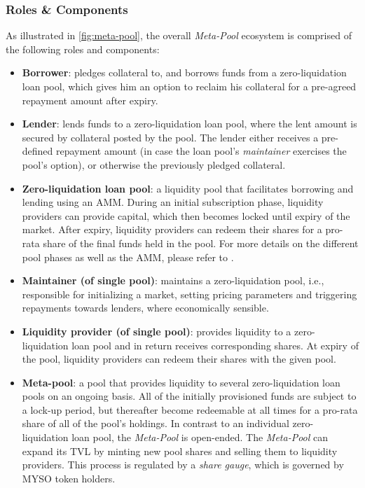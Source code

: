 \documentclass[a4paper]{article}
\begin{document}
\subsubsection{Roles \& Components}
\label{sec:roles}
As illustrated in \cref{fig:meta-pool}, the overall \emph{Meta-Pool} ecosystem is comprised of the following roles and components:
\begin{itemize}
    \item \textbf{Borrower}: pledges collateral to, and borrows funds from a zero-liquidation loan pool, which gives him an option to reclaim his collateral for a pre-agreed repayment amount after expiry.
    \item \textbf{Lender}: lends funds to a zero-liquidation loan pool, where the lent amount is secured by collateral posted by the pool. The lender either receives a pre-defined repayment amount (in case the loan pool's \emph{maintainer} exercises the pool's option), or otherwise the previously pledged collateral.
    \item \textbf{Zero-liquidation loan pool}: a liquidity pool that facilitates borrowing and lending using an AMM. During an initial subscription phase, liquidity providers can provide capital, which then becomes locked until expiry of the market. After expiry, liquidity providers can redeem their shares for a pro-rata share of the final funds held in the pool. For more details on the different pool phases as well as the AMM, please refer to \cite{sardon}.
    \item \textbf{Maintainer (of single pool)}: maintains a zero-liquidation pool, i.e., responsible for initializing a market, setting pricing parameters and triggering repayments towards lenders, where economically sensible.
    \item \textbf{Liquidity provider (of single pool)}: provides liquidity to a zero-liquidation loan pool and in return receives corresponding shares. At expiry of the pool, liquidity providers can redeem their shares with the given pool. 
    \item \textbf{Meta-pool}: a pool that provides liquidity to several zero-liquidation loan pools on an ongoing basis. All of the initially provisioned funds are subject to a lock-up period, but thereafter become redeemable at all times for a pro-rata share of all of the pool's holdings. In contrast to an individual zero-liquidation loan pool, the \emph{Meta-Pool} is open-ended. The \emph{Meta-Pool} can expand its TVL by minting new pool shares and selling them to liquidity providers. This process is regulated by a \emph{share gauge}, which is governed by MYSO token holders.

\end{itemize}
\end{document}
